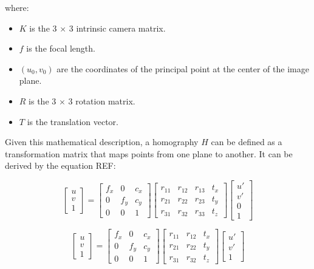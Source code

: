 where:
\begin{itemize}
    \item $K$ is the 3 $\times$ 3 intrinsic camera matrix.
    \item $f$ is the focal length.
    \item $(u_0,v_0)$ are the coordinates of the principal point at the center of the image plane.
    \item $R$ is the 3 $\times$ 3 rotation matrix.
    \item $T$ is the translation vector.
    
\end{itemize}

Given this  mathematical description, a homography $H$ can be defined as a transformation matrix that maps points from one plane to another. It can be derived by the equation REF:

\begin{equation*}
    \begin{bmatrix} u\\ v\\ 1 \end{bmatrix} = \begin{bmatrix}
        f_x & 0   & c_x\\ 
        0   & f_y & c_y \\ 
        0   & 0   & 1 
        \end{bmatrix}
        \begin{bmatrix}
        r_{11}& r_{12} & r_{13} & t_{x} \\ 
        r_{21}& r_{22} & r_{23} & t_{y} \\
        r_{31}& r_{32} & r_{33} & t_{z}
        \end{bmatrix}
        \begin{bmatrix} u'\\ v'\\ 0 \\ 1 \end{bmatrix}
\end{equation*}

\begin{equation*}
    \begin{bmatrix} u\\ v\\ 1 \end{bmatrix} = \begin{bmatrix}
        f_x & 0   & c_x\\ 
        0   & f_y & c_y \\ 
        0   & 0   & 1 
        \end{bmatrix}
        \begin{bmatrix}
        r_{11}& r_{12} & t_{x} \\ 
        r_{21}& r_{22} & t_{y} \\
        r_{31}& r_{32} & t_{z}
        \end{bmatrix}
        \begin{bmatrix} u'\\ v'\\ 1 \end{bmatrix}
\end{equation*}

